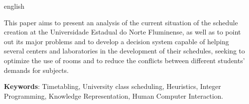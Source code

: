 \begin{resumo}[Abstract]
  \begin{otherlanguage*}{english}

    This paper aims to present an analysis of the current situation of the schedule creation at the Universidade Estadual do Norte Fluminense, as well as to point out its major problems and to develop a decision system capable of helping several centers and laboratories in the development of their schedules, seeking to optimize the use of rooms and to reduce the conflicts between different students' demands for subjects.

    \vspace{\onelineskip}

    \textbf{Keywords}: Timetabling, University class scheduling, Heuristics, Integer Programming, Knowledge Representation, Human Computer Interaction.

  \end{otherlanguage*}
\end{resumo}